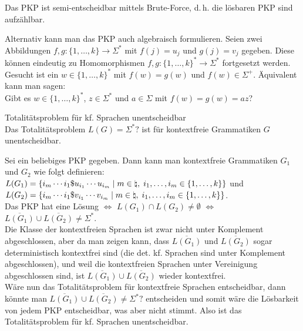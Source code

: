 \begin{Bem}
    Das PKP ist semi-entscheidbar mittels Brute-Force,
    d.\,h. die lösbaren PKP sind aufzählbar.
\end{Bem}

\linie

\begin{Bem}
    Alternativ kann man das PKP auch algebraisch formulieren.
    Seien zwei Abbildungen $f, g\colon \{1, \dotsc, k\} \rightarrow \Sigma^\ast$
    mit $f(j) = u_j$ und $g(j) = v_j$ gegeben.
    Diese können eindeutig zu Homomorphismen
    $f, g\colon \{1, \dotsc, k\}^\ast \rightarrow \Sigma^\ast$ fortgesetzt werden.\\
    Gesucht ist ein $w \in \{1, \dotsc, k\}^\ast$ mit $f(w) = g(w)$ und $f(w) \in \Sigma^+$.
    Äquivalent kann man sagen:\\
    Gibt es $w \in \{1, \dotsc, k\}^\ast$, $z \in \Sigma^\ast$ und $a \in \Sigma$ mit
    $f(w) = g(w) = az$?
\end{Bem}

\begin{Satz}{Totalitätsproblem für kf. Sprachen unentscheidbar}\\
    Das Totalitätsproblem $L(G) = \Sigma^\ast?$ ist für kontextfreie Grammatiken $G$
    unentscheidbar.
\end{Satz}

\begin{Beweis}
    Sei ein beliebiges PKP gegeben.
    Dann kann man kontextfreie Grammatiken $G_1$ und $G_2$ wie folgt definieren:
    $L(G_1) = \{i_m \dotsb i_1 \$ u_{i_1} \dotsb u_{i_m} \;|\;
    m \in \natural,\; i_1, \dotsc, i_m \in \{1, \dotsc, k\}\}$ und\\
    $L(G_2) = \{i_m \dotsb i_1 \$ v_{i_1} \dotsb v_{i_m} \;|\;
    m \in \natural,\; i_1, \dotsc, i_m \in \{1, \dotsc, k\}\}$.\\
    Das PKP hat eine Lösung $\iff$ $L(G_1) \cap L(G_2) \not= \emptyset$
    $\iff$ $\overline{L(G_1)} \cup \overline{L(G_2)} \not= \Sigma^\ast$.\\
    Die Klasse der kontextfreien Sprachen ist zwar nicht unter Komplement abgeschlossen,
    aber da man zeigen kann, dass $\overline{L(G_1)}$ und $\overline{L(G_2)}$ sogar
    deterministisch kontextfrei sind (die det. kf. Sprachen sind unter Komplement abgeschlossen),
    und weil die kontextfreien Sprachen unter Vereinigung abgeschlossen sind, ist
    $\overline{L(G_1)} \cup \overline{L(G_2)}$ wieder kontextfrei.\\
    Wäre nun das Totalitätsproblem für kontextfreie Sprachen entscheidbar, dann könnte man
    $\overline{L(G_1)} \cup \overline{L(G_2)} \not= \Sigma^\ast?$ entscheiden und somit
    wäre die Lösbarkeit von jedem PKP entscheidbar, was aber nicht stimmt.
    Also ist das Totalitätsproblem für kf. Sprachen unentscheidbar.
\end{Beweis}

